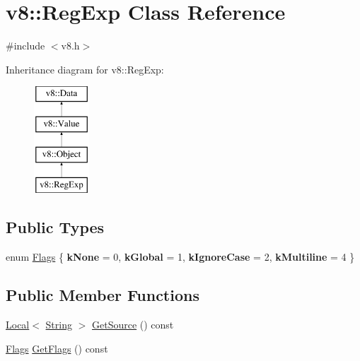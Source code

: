 \hypertarget{classv8_1_1RegExp}{}\section{v8\+:\+:Reg\+Exp Class Reference}
\label{classv8_1_1RegExp}


{\ttfamily \#include $<$v8.\+h$>$}

Inheritance diagram for v8\+:\+:Reg\+Exp\+:\begin{figure}[H]
\begin{center}
\leavevmode
\includegraphics[height=4.000000cm]{classv8_1_1RegExp}
\end{center}
\end{figure}
\subsection*{Public Types}
\begin{DoxyCompactItemize}
\item 
enum \hyperlink{classv8_1_1RegExp_aa4718a5c1f18472aff3bf51ed694fc5a}{Flags} \{ {\bfseries k\+None} = 0, 
{\bfseries k\+Global} = 1, 
{\bfseries k\+Ignore\+Case} = 2, 
{\bfseries k\+Multiline} = 4
 \}
\end{DoxyCompactItemize}
\subsection*{Public Member Functions}
\begin{DoxyCompactItemize}
\item 
\hyperlink{classv8_1_1Local}{Local}$<$ \hyperlink{classv8_1_1String}{String} $>$ \hyperlink{classv8_1_1RegExp_a448213f2a92d964ed260b51429d5e590}{Get\+Source} () const 
\item 
\hyperlink{classv8_1_1RegExp_aa4718a5c1f18472aff3bf51ed694fc5a}{Flags} \hyperlink{classv8_1_1RegExp_ad5a5e77e6e626b3c7c69eef7ba2908cc}{Get\+Flags} () const 
\end{DoxyCompactItemize}
